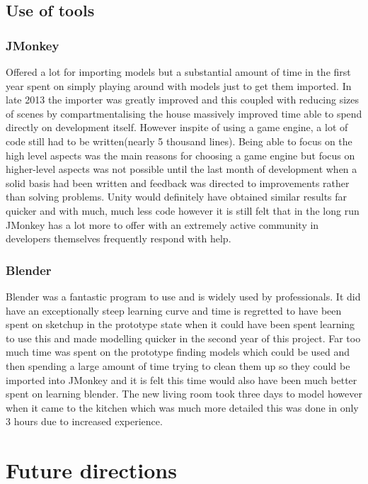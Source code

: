 \subsection{Use of tools}

\subsubsection{JMonkey}
Offered a lot for importing models but a substantial amount of time in the first year spent on simply playing around with models just to get them imported. In late 2013 the importer was greatly improved and this coupled with reducing sizes of scenes by compartmentalising the house massively improved time able to spend directly on development itself.
However inspite of using a game engine, a lot of code still had to be written(nearly 5 thousand lines). Being able to focus on the high level aspects was the main reasons for choosing a game engine but focus on higher-level aspects was not possible until the last month of development when a solid basis had been written and feedback was directed to improvements rather than solving problems.
Unity would definitely have obtained similar results far quicker and with much, much less code however it is still felt that in the long run JMonkey has a lot more to offer with an extremely active community in developers themselves frequently respond with help.


\subsubsection{Blender}
Blender was a fantastic program to use and is widely used by professionals. It did have an exceptionally steep learning curve and time is regretted to have been spent on sketchup in the prototype state when it could have been spent learning to use this and made modelling quicker in the second year of this project. Far too much time was spent on the prototype finding models which could be used and then spending a large amount of time trying to clean them up so they could be imported into JMonkey and it is felt this time would also have been much better spent on learning blender. The new living room took three days to model however when it came to the kitchen which was much more detailed this was done in only 3 hours due to increased experience.

\section{Future directions}

